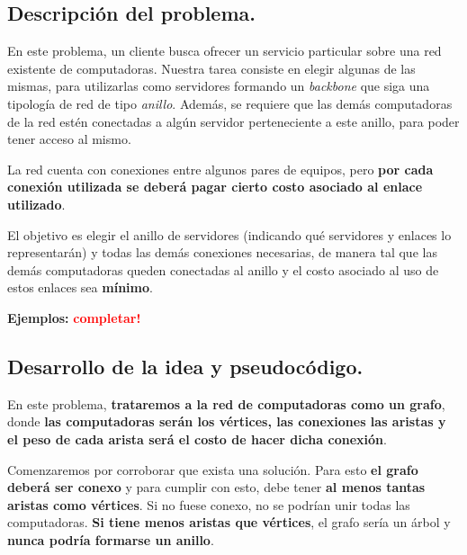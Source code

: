 \subsection{Descripción del problema.}

\vspace*{0.3cm}

En este problema, un cliente busca ofrecer un servicio particular sobre una
red existente de computadoras. Nuestra tarea consiste en elegir algunas de las
mismas, para utilizarlas como servidores formando un \textit{backbone} que
siga una tipología de red de tipo \textit{anillo}. Además, se requiere que
las demás computadoras de la red estén conectadas a algún servidor
perteneciente a este anillo, para poder tener acceso al mismo.

La red cuenta con conexiones entre algunos pares de equipos, pero
\textbf{por cada conexión utilizada se deberá pagar cierto costo
asociado al enlace utilizado}.

\medskip

El objetivo es elegir el anillo de servidores (indicando qué servidores y
enlaces lo representarán) y todas las demás conexiones necesarias, de
manera tal que las demás computadoras queden conectadas al anillo y el costo
asociado al uso de estos enlaces sea \textbf{mínimo}.

\vspace*{0.5cm}

\textbf{Ejemplos:}
  \textcolor{red}{\textbf{completar!}}



\newpage
\subsection{Desarrollo de la idea y pseudocódigo.}

\vspace*{0.3cm}

En este problema, \textbf{trataremos a la red de computadoras como un grafo},
donde \textbf{las computadoras serán los vértices, las conexiones las aristas
y el peso de cada arista será el costo de hacer dicha conexión}.

Comenzaremos por corroborar que exista una solución. Para esto \textbf{el
grafo deberá ser conexo} y para cumplir con esto, debe tener \textbf{al
menos tantas aristas como vértices}. Si no fuese conexo, no se podrían
unir todas las computadoras. \textbf{Si tiene menos aristas que vértices},
el grafo sería un árbol y \textbf{nunca podría formarse un anillo}.

